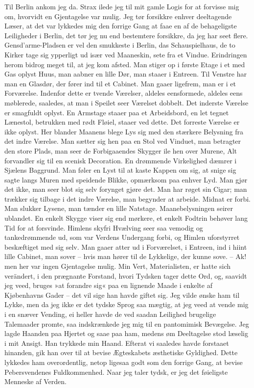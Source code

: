 \documentclass[12pt,a4paper]{article}
\begin{document}
Til Berlin ankom jeg da. Strax ilede jeg til mit gamle Logis for at forvisse mig om, hvorvidt en Gjentagelse var mulig. Jeg tør forsikkre enhver deeltagende Læser, at det var lykkedes mig den forrige Gang at faae en af de behageligste Leiligheder i Berlin, det tør jeg nu end bestemtere forsikkre, da jeg har seet flere. Gensd'arme-Pladsen er vel den smukkeste i Berlin, das Schauspielhaus, de to Kirker tage sig ypperligt ud især ved Maaneskin, sete fra et Vindue. Erindringen herom bidrog meget til, at jeg kom afsted. Man stiger op i første Etage i et med Gas oplyst Huus, man aabner en lille Dør, man staaer i Entreen. Til Venstre har man en Glasdør, der fører ind til et Cabinet. Man gaaer ligefrem, man er i et Forværelse. Indenfor dette er tvende Værelser, aldeles eensformede, aldeles eens møblerede, saaledes, at man i Speilet seer Værelset dobbelt. Det inderste Værelse er smagfuldt oplyst. En Armstage staaer paa et Arbeidsbord, en let tegnet Lænestol, betrukken med rødt Fløiel, staaer ved dette. Det forreste Værelse er ikke oplyst. Her blander Maanens blege Lys sig med den stærkere Belysning fra det indre Værelse. Man sætter sig hen paa en Stol ved Vinduet, man betragter den store Plads, man seer de Forbigaaendes Skygger ile hen over Murene, Alt forvandler sig til en scenisk Decoration. En drømmende Virkelighed dæmrer i Sjælens Baggrund. Man føler en Lyst til at kaste Kappen om sig, at snige sig sagte langs Muren med speidende Blikke, opmærksom paa enhver Lyd. Man gjør det ikke, man seer blot sig selv forynget gjøre det. Man har røget sin Cigar; man trækker sig tilbage i det indre Værelse, man begynder at arbeide. Midnat er forbi. Man slukker Lysene, man tænder en lille Natstage. Maanebelysningen seirer ublandet. En enkelt Skygge viser sig end mørkere, et enkelt Fodtrin behøver lang Tid for at forsvinde. Himlens skyfri Hvælving seer saa vemodig og tankedrømmende ud, som var Verdens Undergang forbi, og Himlen uforstyrret beskæftiget med sig selv. Man gaaer atter ud i Forværelset, i Entreen, ind i hiint lille Cabinet, man sover – hvis man hører til de Lykkelige, der kunne sove. – Ak! men her var ingen Gjentagelse mulig. Min Vert, Materialisten, er hatte sich verändert, i den prægnante Forstand, hvori Tydsken tager dette Ord, og, saavidt jeg veed, bruges »at forandre sig« paa en lignende Maade i enkelte af Kjøbenhavns Gader – det vil sige han havde giftet sig. Jeg vilde ønske ham til Lykke, men da jeg ikke er det tydske Sprog saa mægtig, at jeg veed at vende mig i en snæver Vending, ei heller havde de ved saadan Leilighed brugelige Talemaader promte, saa indskrænkede jeg mig til en pantomimisk Bevægelse. Jeg lagde Haanden paa Hjertet og saae paa ham, medens øm Deeltagelse stod læselig i mit Ansigt. Han trykkede min Haand. Efterat vi saaledes havde forstaaet hinanden, gik han over til at bevise Ægteskabets æsthetiske Gyldighed. Dette lykkedes ham overordentlig, netop ligesaa godt som den forrige Gang, at bevise Pebersvendenes Fuldkommenhed. Naar jeg taler tydsk, er jeg det føieligste Menneske af Verden.
\end{document}
